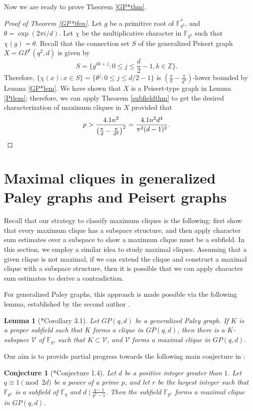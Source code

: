 \documentclass[12pt,reqno]{amsart}
\newtheorem{lem}[thm]{Lemma}
\newtheorem{conj}[thm]{Conjecture}
\theoremstyle{definition}
\newcommand{\Z}{\mathbb{Z}}
\newcommand{\F}{\mathbb{F}}
\begin{document}
Now we are ready to prove Theorem \ref{GP*thm}.

\begin{proof}[Proof of Theorem \ref{GP*thm}]
Let $g$ be a primitive root of $\F_{q^2}^*$, and $\theta=\exp(2\pi i/d)$. Let $\chi$ be the multiplicative character in $\F_{q^2}$ such that $\chi(g)=\theta$. Recall that the connection set $S$ of the generalized Peisert graph $X=GP^*(q^2,d)$ is given by
$$
S=\bigg\{g^{dk+j}: 0\leq j \leq \frac{d}{2}-1, k \in \Z\bigg\}.
$$
Therefore, $\{\chi(x):x \in S\}=\{\theta^j :0 \leq j \leq d/2-1\}$ is $\left(\frac{\pi}{d}-\frac{\pi}{d^2}\right)$-lower bounded by Lemma \ref{GP*lem}. We have shown that $X$ is a Peisert-type graph in Lemma \ref{Ptlem}; therefore, we can apply Theorem \ref{subfieldthm} to get the desired characterization of maximum cliques in $X$ provided that
\[
p>\frac{4.1n^2}{\big(\frac{\pi}{d}-\frac{\pi}{d^2}\big)^2}=\frac{4.1n^2d^4}{\pi^2(d-1)^2}.\qedhere
\]
\end{proof}

\section{Maximal cliques in generalized Paley graphs and Peisert graphs}\label{sect:maximal}

Recall that our strategy to classify maximum cliques is the following: first show that every maximum clique has a subspace structure, and then apply character sum estimates over a subspace to show a maximum clique must be a subfield. In this section, we employ a similar idea to study maximal cliques. Assuming that a given clique is not maximal, if we can extend the clique and construct a maximal clique with a subspace structure, then it is possible that we can apply character sum estimates to derive a contradiction. 

For generalized Paley graphs, this approach is made possible via the following lemma, established by the second author \cite{Yip3}.

\begin{lem}[\cite{Yip3}*{Corollary 3.1}] \label{maximal}
Let $GP(q,d)$ be a generalized Paley graph. If $K$ is a proper subfield such that $K$ forms a clique in $GP(q,d)$, then there is a $K$-subspace $\mathcal{V}$ of $\F_q$, such that $K \subset \mathcal{V}$, and $\mathcal{V}$ forms a maximal clique in $GP(q,d)$. 
\end{lem}



Our aim is to provide partial progress towards the following main conjecture in \cite{Yip3}:
\begin{conj}[\cite{Yip3}*{Conjecture 1.4}]\label{maxconj}
Let $d$ be a positive integer greater than $1$. Let $q \equiv 1 \pmod {2d}$ be a power of a prime $p$, and let $r$ be the largest integer such that $\F_{p^r}$ is a subfield of $\F_q$ and $d \mid \frac{q-1}{p^r-1}$. Then the subfield $\F_{p^r}$ forms a maximal clique in $GP(q,d)$.
\end{conj}
\end{document}
